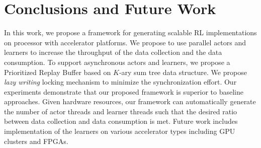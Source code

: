 \section{Conclusions and Future Work}
In this work, we propose a framework for generating scalable RL implementations on processor with accelerator platforms. We propose to use parallel actors and learners to increase the throughput of the data collection and the data consumption. To support asynchronous actors and learners, we propose a Prioritized Replay Buffer based on $K$-ary sum tree data structure. We propose \textit{lazy writing} locking mechanism to minimize the synchronization effort. Our experiments demonstrate that our proposed framework is superior to baseline approaches. Given hardware resources, our framework can automatically generate the number of actor threads and learner threads such that the desired ratio between data collection and data consumption is met. Future work includes implementation of the learners on various accelerator types including GPU clusters and FPGAs.
